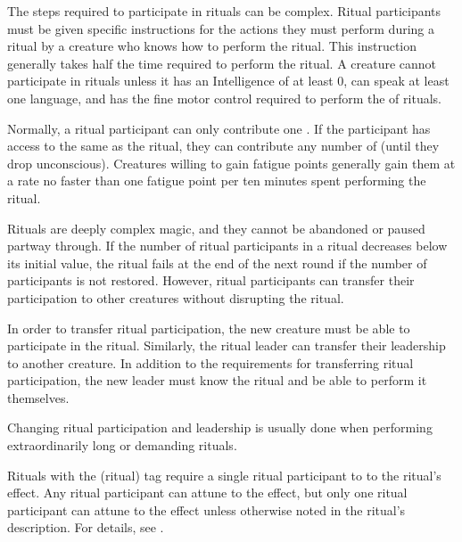             The steps required to participate in rituals can be complex.
            Ritual participants must be given specific instructions for the actions they must perform during a ritual by a creature who knows how to perform the ritual.
            This instruction generally takes half the time required to perform the ritual.
            A creature cannot participate in rituals unless it has an Intelligence of at least 0, can speak at least one language, and has the fine motor control required to perform the  of rituals.

            Normally, a ritual participant can only contribute one .
            If the participant has access to the same  as the ritual, they can contribute any number of  (until they drop unconscious).
            Creatures willing to gain fatigue points generally gain them at a rate no faster than one fatigue point per ten minutes spent performing the ritual.

            Rituals are deeply complex magic, and they cannot be abandoned or paused partway through.
            If the number of ritual participants in a ritual decreases below its initial value, the ritual fails at the end of the next round if the number of participants is not restored.
            However, ritual participants can transfer their participation to other creatures without disrupting the ritual.

            In order to transfer ritual participation, the new creature must be able to participate in the ritual.
            Similarly, the ritual leader can transfer their leadership to another creature.
            In addition to the requirements for transferring ritual participation, the new leader must know the ritual and be able to perform it themselves.

            Changing ritual participation and leadership is usually done when performing extraordinarily long or demanding rituals.

                Rituals with the  (ritual) tag require a single ritual participant to  to the ritual's effect.
                Any ritual participant can attune to the effect, but only one ritual participant can attune to the effect unless otherwise noted in the ritual's description.
                For details, see .

